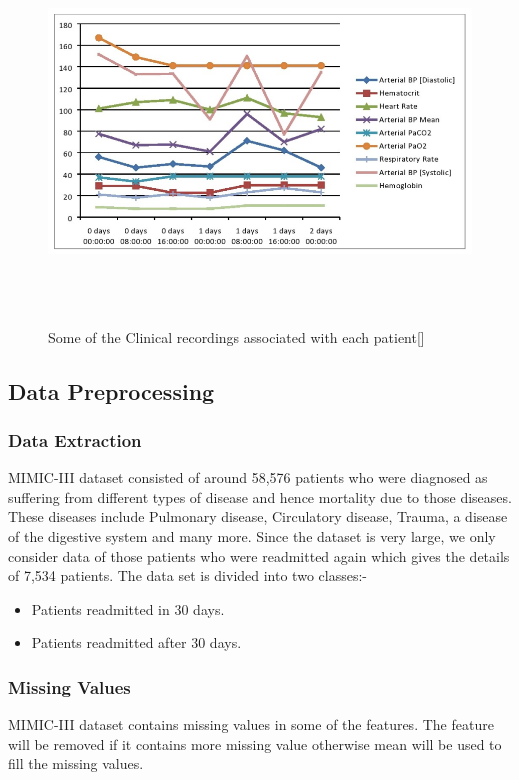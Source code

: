 \documentclass[12pt,a4paper]{article}
\begin{document}
\begin{figure}[H]
    \centering
    \includegraphics[width=7in,height=4in]{mimic.png}
    \caption{Some of the Clinical recordings associated with each patient[]}
    \label{fig:mimic-iii}
\end{figure}
\subsection{Data Preprocessing}
\subsubsection{Data Extraction}
MIMIC-III dataset consisted of around 58,576 patients who were diagnosed as suffering from different types of disease and hence mortality due to those diseases.  These diseases include Pulmonary disease, Circulatory disease, Trauma, a disease of the digestive system and many more.  Since the dataset is very large, we only consider data of those patients who were readmitted again which gives the details of 7,534  patients.   The data set is divided into two classes:-
\begin{itemize}
    \item Patients readmitted in 30 days.
    \item Patients readmitted after 30 days.
\end{itemize}


\subsubsection{Missing Values}
MIMIC-III  dataset contains missing values in some of the features.   The feature will  be removed if it contains more missing value otherwise mean will be used to fill the missing values.
\end{document}
